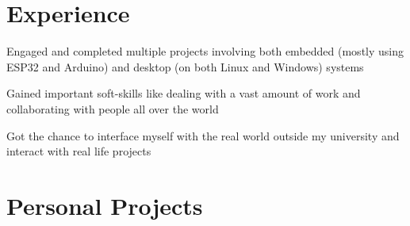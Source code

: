 \documentclass[]{plushcv}
\begin{document}
\begin{minipage}[t]{0.60\textwidth}



\section{Experience}
\vspace{\topsep} %
\begin{tightemize}
\sectionsep
\item Engaged and completed multiple projects involving both embedded (mostly using ESP32 and Arduino)
and desktop (on both Linux and Windows) systems
\item Gained important soft-skills like dealing with a vast amount of work and collaborating with people all
over the world
\item Got the chance to interface myself with the real world outside my university and interact with real life
projects
\end{tightemize}
\sectionsep



\section{Personal Projects}


\end{minipage}
\end{document}
